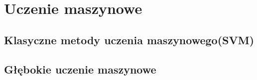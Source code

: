 \chapter{Uczenie maszynowe}

\section{Klasyczne metody uczenia maszynowego(SVM)}

\section{Głębokie uczenie maszynowe}